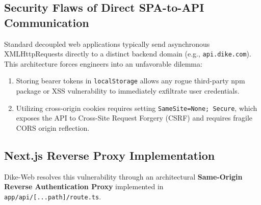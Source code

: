 \documentclass[conference,10pt,a4paper]{IEEEtran}
\begin{document}
\subsection{Security Flaws of Direct SPA-to-API Communication}
Standard decoupled web applications typically send asynchronous XMLHttpRequests directly to a distinct backend domain (e.g., \texttt{api.dike.com}). This architecture forces engineers into an unfavorable dilemma:
\begin{enumerate}
    \item Storing bearer tokens in \texttt{localStorage} allows any rogue third-party npm package or XSS vulnerability to immediately exfiltrate user credentials.
    \item Utilizing cross-origin cookies requires setting \texttt{SameSite=None; Secure}, which exposes the API to Cross-Site Request Forgery (CSRF) and requires fragile CORS origin reflection.
\end{enumerate}

\subsection{Next.js Reverse Proxy Implementation}
Dike-Web resolves this vulnerability through an architectural \textbf{Same-Origin Reverse Authentication Proxy} implemented in \texttt{app/api/[...path]/route.ts}.
\end{document}
